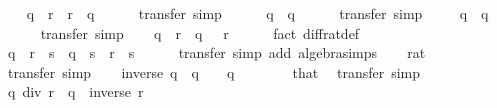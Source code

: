\begin{isabellebody}
\ \ \isamarkupfalse%
\ {\isachardoublequoteopen}q\ {\isacharplus}{\kern0pt}\ r\ {\isacharequal}{\kern0pt}\ r\ {\isacharplus}{\kern0pt}\ q{\isachardoublequoteclose}\isanewline
\ \ \ \ \isamarkupfalse%
\ transfer\ simp\isanewline
\ \ \isamarkupfalse%
\ {\isachardoublequoteopen}{}\ {\isacharplus}{\kern0pt}\ q\ {\isacharequal}{\kern0pt}\ q{\isachardoublequoteclose}\isanewline
\ \ \ \ \isamarkupfalse%
\ transfer\ simp\isanewline
\ \ \isamarkupfalse%
\ {\isachardoublequoteopen}{\isacharminus}{\kern0pt}\ q\ {\isacharplus}{\kern0pt}\ q\ {\isacharequal}{\kern0pt}\ {}{\isachardoublequoteclose}\isanewline
\ \ \ \ \isamarkupfalse%
\ transfer\ simp\isanewline
\ \ \isamarkupfalse%
\ {\isachardoublequoteopen}q\ {\isacharminus}{\kern0pt}\ r\ {\isacharequal}{\kern0pt}\ q\ {\isacharplus}{\kern0pt}\ {\isacharminus}{\kern0pt}\ r{\isachardoublequoteclose}\isanewline
\ \ \ \ \isamarkupfalse%
\ {\isacharparenleft}{\kern0pt}fact\ diff{\isacharunderscore}{\kern0pt}rat{\isacharunderscore}{\kern0pt}def{\isacharparenright}{\kern0pt}\isanewline
\ \ \isamarkupfalse%
\ {\isachardoublequoteopen}{\isacharparenleft}{\kern0pt}q\ {\isacharplus}{\kern0pt}\ r{\isacharparenright}{\kern0pt}\ {\isacharasterisk}{\kern0pt}\ s\ {\isacharequal}{\kern0pt}\ q\ {\isacharasterisk}{\kern0pt}\ s\ {\isacharplus}{\kern0pt}\ r\ {\isacharasterisk}{\kern0pt}\ s{\isachardoublequoteclose}\isanewline
\ \ \ \ \isamarkupfalse%
\ transfer\ {\isacharparenleft}{\kern0pt}simp\ add{\isacharcolon}{\kern0pt}\ algebra{\isacharunderscore}{\kern0pt}simps{\isacharparenright}{\kern0pt}\isanewline
\ \ \isamarkupfalse%
\ {\isachardoublequoteopen}{\isacharparenleft}{\kern0pt}{}{\isacharcolon}{\kern0pt}{\isacharcolon}{\kern0pt}rat{\isacharparenright}{\kern0pt}\ {\isasymnoteq}\ {}{\isachardoublequoteclose}\isanewline
\ \ \ \ \isamarkupfalse%
\ transfer\ simp\isanewline
\ \ \isamarkupfalse%
\ {\isachardoublequoteopen}inverse\ q\ {\isacharasterisk}{\kern0pt}\ q\ {\isacharequal}{\kern0pt}\ {}{\isachardoublequoteclose}\ \ {\isachardoublequoteopen}q\ {\isasymnoteq}\ {}{\isachardoublequoteclose}\isanewline
\ \ \ \ \isamarkupfalse%
\ that\ \isamarkupfalse%
\ transfer\ simp\isanewline
\ \ \isamarkupfalse%
\ {\isachardoublequoteopen}q\ div\ r\ {\isacharequal}{\kern0pt}\ q\ {\isacharasterisk}{\kern0pt}\ inverse\ r{\isachardoublequoteclose}\isanewline

\end{isabellebody}
